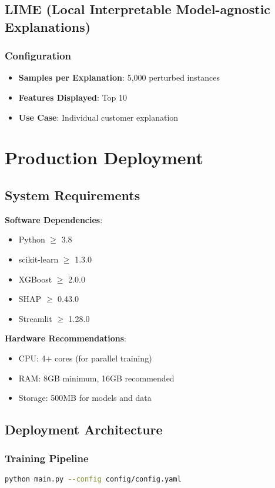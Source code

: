 \documentclass[11pt,a4paper]{article}
\begin{document}
\subsection{LIME (Local Interpretable Model-agnostic Explanations)}

\subsubsection{Configuration}
\begin{itemize}
    \item \textbf{Samples per Explanation}: 5,000 perturbed instances
    \item \textbf{Features Displayed}: Top 10
    \item \textbf{Use Case}: Individual customer explanation
\end{itemize}

\section{Production Deployment}

\subsection{System Requirements}

\textbf{Software Dependencies}:
\begin{itemize}
    \item Python $\geq$ 3.8
    \item scikit-learn $\geq$ 1.3.0
    \item XGBoost $\geq$ 2.0.0
    \item SHAP $\geq$ 0.43.0
    \item Streamlit $\geq$ 1.28.0
\end{itemize}

\textbf{Hardware Recommendations}:
\begin{itemize}
    \item CPU: 4+ cores (for parallel training)
    \item RAM: 8GB minimum, 16GB recommended
    \item Storage: 500MB for models and data
\end{itemize}

\subsection{Deployment Architecture}

\subsubsection{Training Pipeline}
\begin{lstlisting}[language=bash]
python main.py --config config/config.yaml
\end{lstlisting}
\end{document}
